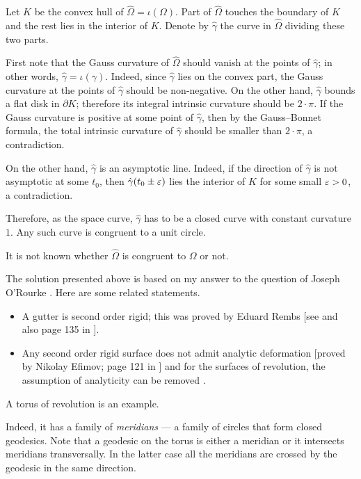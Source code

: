 Let $K$ be the convex hull of $\hat\Omega=\iota(\Omega)$.
Part of $\hat\Omega$ touches the boundary of $K$ and the rest lies in the interior of $K$. 
Denote by $\hat\gamma$ the curve in $\hat\Omega$ dividing these two parts.

First note that the Gauss curvature of $\hat\Omega$ should vanish at the points of $\hat\gamma$;
in other words, $\hat\gamma=\iota(\gamma)$.
Indeed, since $\hat\gamma$ lies on the convex part, 
the Gauss curvature at the points of $\hat\gamma$ should be non-negative. 
On the other hand, $\hat\gamma$ bounds a flat disk in $\partial K$;
therefore its integral intrinsic curvature should be $2{\cdot}\pi$.
If the Gauss curvature is positive at some point of $\hat\gamma$, 
then by the Gauss--Bonnet formula, the total intrinsic curvature of $\hat\gamma$ should be smaller than $2{\cdot}\pi$, a contradiction.

On the other hand, $\hat\gamma$ is an asymptotic line.
Indeed, if the direction of $\hat\gamma$ is not asymptotic at some $t_0$,
then $\hat\gamma(t_0 \pm\varepsilon)$ lies the interior of $K$ for some small $\varepsilon>0$, a contradiction.

Therefore, as the space curve,
$\hat\gamma$ has to be a closed curve with constant curvature $1$.
Any such curve is congruent to a unit circle.\qeds

It is not known whether $\hat\Omega$ is congruent to $\Omega$ or not.

The solution presented above is based on my answer 
to the question of Joseph O'Rourke \cite{rourke}.
Here are some related statements.
\begin{itemize}
\item A gutter is second order rigid;
this was proved by Eduard Rembs
[see  and also page 135 in ].
\item Any second order rigid surface does not admit analytic deformation 
[proved by Nikolay Efimov; page 121 in ]
and for the surfaces of revolution, the assumption of analyticity can be removed 
\cite[proved by Idzhad Sabitov, see][]{sabitov}.
\end{itemize}









A torus of revolution is an example.

Indeed, it has a family of {}\emph{meridians} --- a family of circles that form closed geodesics.
Note that a geodesic on the torus is either a meridian
or it intersects meridians transversally.
In the latter case all the meridians are crossed by the geodesic in the same direction.

